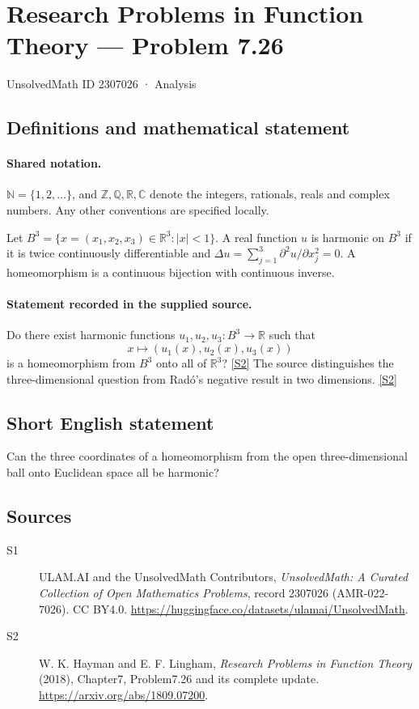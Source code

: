 \documentclass[11pt]{article}
\newcommand{\sref}[2]{\hyperlink{source:#1:#2}{[S#2]}}
\begin{document}
\setcounter{section}{2307025}
\section{Research Problems in Function Theory — Problem 7.26}\label{2307026}
{\small\sffamily UnsolvedMath ID 2307026 · Analysis}
\subsection{Definitions and mathematical statement}

\paragraph{Shared notation.}$\mathbb N=\{1,2,\ldots\}$, and $\mathbb Z,\mathbb Q,\mathbb R,\mathbb C$ denote the integers, rationals, reals and complex numbers. Any other conventions are specified locally.


Let $B^3=\{x=(x_1,x_2,x_3)\in\mathbb R^3:|x|<1\}$. A real function $u$ is harmonic on $B^3$ if it is twice continuously differentiable and $\Delta u=\sum_{j=1}^3\partial^2u/\partial x_j^2=0$. A homeomorphism is a continuous bijection with continuous inverse.

\paragraph{Statement recorded in the supplied source.}
Do there exist harmonic functions $u_1,u_2,u_3:B^3\to\mathbb R$ such that
\[x\longmapsto (u_1(x),u_2(x),u_3(x))\]
is a homeomorphism from $B^3$ onto all of $\mathbb R^3$? \sref{2307026}{2}
The source distinguishes the three-dimensional question from Radó's negative result in two dimensions. \sref{2307026}{2}
\subsection{Short English statement}
Can the three coordinates of a homeomorphism from the open three-dimensional ball onto Euclidean space all be harmonic?
\subsection{Sources}
\begin{description}
\item[\hypertarget{source:2307026:1}{S1}] ULAM.AI and the UnsolvedMath Contributors, \emph{UnsolvedMath: A Curated Collection of Open Mathematics Problems}, record 2307026 (AMR-022-7026). CC BY4.0. \url{https://huggingface.co/datasets/ulamai/UnsolvedMath}.
\item[\hypertarget{source:2307026:2}{S2}] W. K. Hayman and E. F. Lingham, \emph{Research Problems in Function Theory} (2018), Chapter7, Problem7.26 and its complete update. \url{https://arxiv.org/abs/1809.07200}.
\end{description}
\label{end:2307026}
\end{document}
